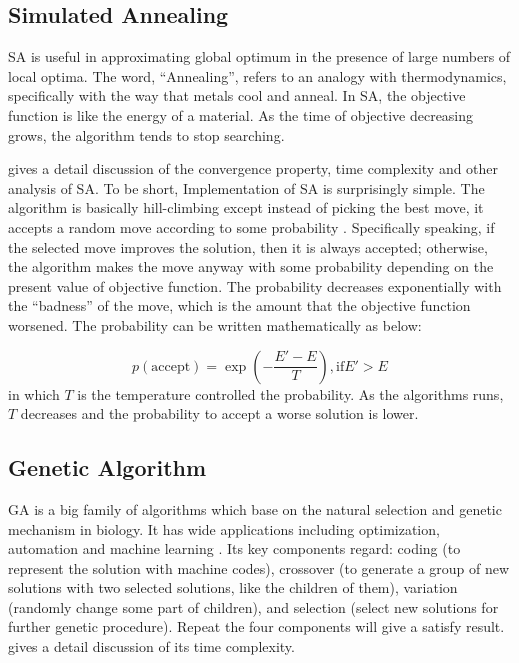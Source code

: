 \documentclass{article}
\begin{document}
	\subsection{Simulated Annealing}

	SA is useful in approximating global optimum in the presence of large numbers of local optima.  The word, “Annealing”, refers to an analogy with thermodynamics, specifically with the way that metals cool and anneal.  In SA, the objective function is like the energy of a material. As the time of objective decreasing grows, the algorithm tends to stop searching.

	\cite{ref4} gives a detail discussion of the convergence property, time complexity and other analysis of SA. To be short, Implementation of SA is surprisingly simple.  The algorithm is basically hill-climbing except instead of picking the best move, it accepts a random move according to some probability \cite{ref4, ref5}. Specifically speaking, if the selected move improves the solution, then it is always accepted; otherwise, the algorithm makes the move anyway with some probability depending on the present value of objective function. The probability decreases exponentially with the “badness” of the move, which is the amount that the objective function worsened. The probability can be written mathematically as below:

	\begin{equation*}
	p(\text{accept}) = \exp (-\frac{E'-E}{T}), \text{if} E' > E
	\end{equation*}
in which $T$ is the temperature controlled the probability. As the algorithms runs, $T$ decreases and the probability to accept a worse solution is lower.

	\subsection{Genetic Algorithm}

	GA is a big family of algorithms which base on the natural selection and genetic mechanism in biology. It has wide applications including optimization, automation and machine learning \cite{ref6,8}. Its key components regard: coding (to represent the solution with machine codes), crossover (to generate a group of new solutions with two selected solutions, like the children of them), variation (randomly change some part of children), and selection (select new solutions for further genetic procedure). Repeat the four components will give a satisfy result. \cite{ref7} gives a detail discussion of its time complexity.
\end{document}
